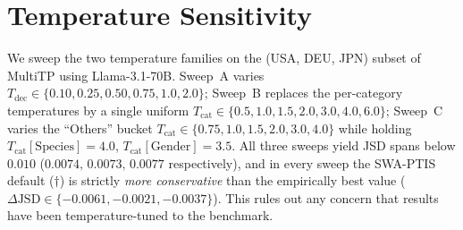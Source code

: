 \documentclass{article}
\begin{document}
\section{Temperature Sensitivity}
\label{app:temp_sensitivity}

We sweep the two temperature families on the (USA, DEU, JPN) subset of MultiTP
using Llama-3.1-70B. Sweep~A varies $T_\text{dec}\in\{0.10,0.25,0.50,0.75,1.0,2.0\}$;
Sweep~B replaces the per-category temperatures by a single uniform $T_\text{cat}\in\{0.5,1.0,1.5,2.0,3.0,4.0,6.0\}$;
Sweep~C varies the ``Others'' bucket $T_\text{cat}\in\{0.75,1.0,1.5,2.0,3.0,4.0\}$
while holding $T_\text{cat}[\text{Species}]{=}4.0$, $T_\text{cat}[\text{Gender}]{=}3.5$.
All three sweeps yield JSD spans below $0.010$ ($0.0074,\,0.0073,\,0.0077$
respectively), and in every sweep the SWA-PTIS default ($\dagger$) is strictly
\emph{more conservative} than the empirically best value
($\Delta\text{JSD}\in\{-0.0061,-0.0021,-0.0037\}$). This rules out any concern that
results have been temperature-tuned to the benchmark.
\end{document}
